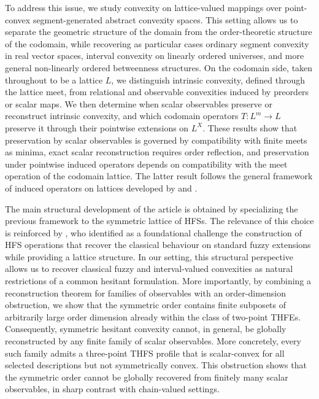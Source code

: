 \documentclass[11pt,a4paper]{article}
\begin{document}
\smallskip

To address this issue, we study convexity on lattice-valued mappings over point-convex segment-generated abstract convexity spaces. This setting allows us to separate the geometric structure of the domain from the order-theoretic structure of the codomain, while recovering as particular cases ordinary segment convexity in real vector spaces, interval convexity on linearly ordered universes, and more general non-linearly ordered betweenness structures. On the codomain side, taken throughout to be a lattice $L$, we distinguish intrinsic convexity, defined through the lattice meet, from relational and observable convexities induced by preorders or scalar maps. We then determine when scalar observables preserve or reconstruct intrinsic convexity, and which codomain operators \(T:L^m\to L\) preserve it through their pointwise extensions on \(L^X\). These results show that preservation by scalar observables is governed by compatibility with finite meets as minima, exact scalar reconstruction requires order reflection, and preservation under pointwise induced operators depends on compatibility with the meet operation of the codomain lattice. The latter result follows the general framework of induced operators on lattices developed by \citet{LobilloMerinoNavarroSantos2021} and \citet{MerinoNavarroSantos2022}.

\smallskip

The main structural development of the article is obtained by specializing the previous framework to the symmetric lattice of HFSs. The relevance of this choice is reinforced by \citet{Rodriguez2016Position}, who identified as a foundational challenge the construction of HFS operations that recover the classical behaviour on standard fuzzy extensions while providing a lattice structure. In our setting, this structural perspective allows us to recover classical fuzzy and interval-valued convexities as natural restrictions of a common hesitant formulation. More importantly, by combining a reconstruction theorem for families of observables with an order-dimension obstruction, we show that the symmetric order contains finite subposets of arbitrarily large order dimension already within the class of two-point THFEs. Consequently, symmetric hesitant convexity cannot, in general, be globally reconstructed by any finite family of scalar observables. More concretely, every such family admits a three-point THFS profile that is scalar-convex for all selected descriptions but not symmetrically convex. This obstruction shows that the symmetric order cannot be globally recovered from finitely many scalar observables, in sharp contrast with chain-valued settings.
\end{document}
